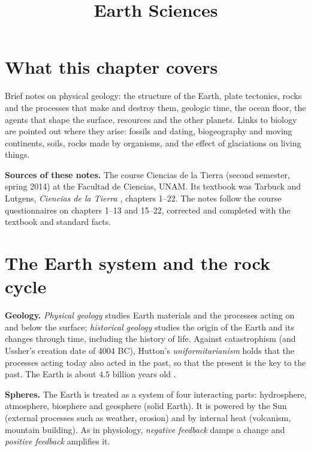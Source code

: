 



\title{Earth Sciences}
\maketitle

\label{section-phantom}

\tableofcontents

\section{What this chapter covers}
\label{section-what-this-chapter-covers}

Brief notes on physical geology: the
structure of the Earth, plate tectonics,
rocks and the processes that make and
destroy them, geologic time, the ocean
floor, the agents that shape the surface,
resources and the other planets. Links to
biology are pointed out where they arise:
fossils and dating, biogeography and
moving continents, soils, rocks made by
organisms, and the effect of glaciations on
living things.

\textbf{Sources of these notes.}
The course Ciencias de la Tierra (second
semester, spring 2014) at the Facultad de
Ciencias, UNAM. Its textbook was Tarbuck and
Lutgens, \emph{Ciencias de la Tierra}
\cite{tarbuckciencias}, chapters 1--22.
The notes follow the course questionnaires
on chapters 1--13 and 15--22, corrected and
completed with the textbook and standard
facts.

\section{The Earth system and the rock
cycle}
\label{section-earth-system}

\textbf{Geology.} \emph{Physical geology}
studies Earth materials and the processes
acting on and below the surface;
\emph{historical geology} studies the
origin of the Earth and its changes through
time, including the history of life. Against
catastrophism (and Ussher's creation date of
4004 BC), Hutton's \emph{uniformitarianism}
holds that the processes acting today also
acted in the past, so that the present is
the key to the past. The Earth is about
$4.5$ billion years old
\cite[Chapter 1]{tarbuckciencias}.

\textbf{Spheres.} The Earth is treated as a
system of four interacting parts:
hydrosphere, atmosphere, biosphere and
geosphere (solid Earth). It is powered by
the Sun (external processes such as
weather, erosion) and by internal heat
(volcanism, mountain building). As in
physiology, \emph{negative feedback} damps a
change and \emph{positive feedback}
amplifies it.

